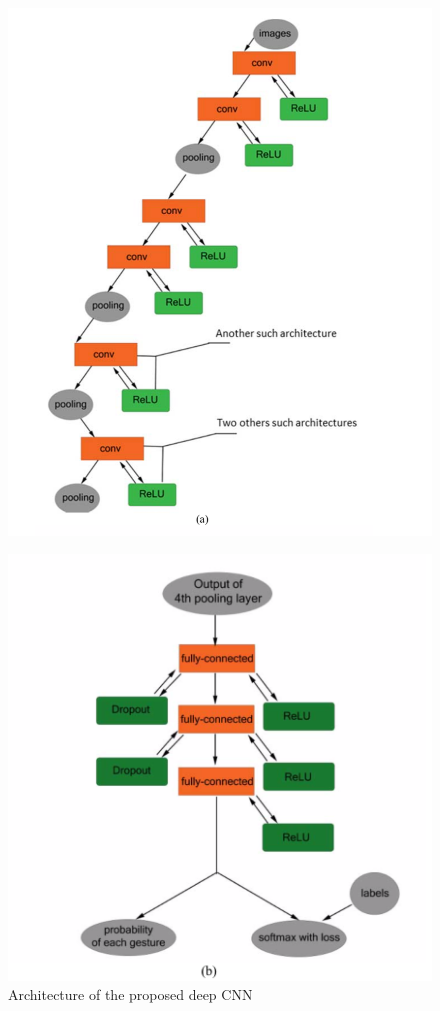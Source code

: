 \documentclass[12pt]{report}
\begin{document}
\begin{figure}[h]
    \centering
    \includegraphics[width=.8\textwidth]{./images/tiny_a.png}
\end{figure}
\bigbreak
\begin{figure}
    \centering
    \includegraphics[width=\textwidth]{./images/tiny_b.png}
    \caption{Architecture of the proposed deep CNN }\label{fig:tiny_architecture}
\end{figure}
\end{document}
